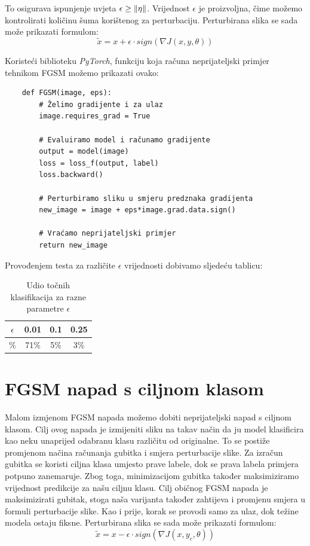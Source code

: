 To osigurava ispunjenje uvjeta $\epsilon \geq \left\|{\eta}\right\|$. Vrijednost $\epsilon$ je proizvoljna, čime možemo kontrolirati količinu šuma korištenog za perturbaciju. Perturbirana slika se sada može prikazati formulom: 
\[\widetilde{x} = x + \epsilon\cdot sign\left(\nabla J(x, y, \theta)\right)\]

Koristeći biblioteku \textit{PyTorch}, funkciju koja računa neprijateljski primjer tehnikom FGSM možemo prikazati ovako:

\begin{verbatim}
    def FGSM(image, eps):
        # Želimo gradijente i za ulaz
        image.requires_grad = True

        # Evaluiramo model i računamo gradijente
        output = model(image)
        loss = loss_f(output, label)
        loss.backward()

        # Perturbiramo sliku u smjeru predznaka gradijenta
        new_image = image + eps*image.grad.data.sign()
        
        # Vraćamo neprijateljski primjer
        return new_image
\end{verbatim}

Provođenjem testa za različite $\epsilon$ vrijednosti dobivamo sljedeću tablicu:

\begin{table}[H]
	\centering
	\begin{tabular}{||c || c | c | c||} 
		\hline
		$\epsilon$ & 0.01 & 0.1 & 0.25 \\ [0.5ex] 
		\hline\hline
		\% & 71\% & 5\% & 3\% \\ 
		\hline
	\end{tabular}
	\caption{Udio točnih klasifikacija za razne parametre $\epsilon$}
\end{table}


\section{FGSM napad s ciljnom klasom}

Malom izmjenom FGSM napada možemo dobiti neprijateljski napad s ciljnom klasom. Cilj ovog napada je izmijeniti sliku na takav način da ju model klasificira kao neku unaprijed odabranu klasu različitu od originalne. To se postiže promjenom načina računanja gubitka i smjera perturbacije slike. Za izračun gubitka se koristi ciljna klasa umjesto prave labele, dok se prava labela primjera potpuno zanemaruje.  Zbog toga, minimizacijom gubitka također maksimiziramo vrijednost predikcije za našu ciljnu klasu. Cilj običnog FGSM napada je maksimizirati gubitak, stoga naša varijanta također zahtijeva i promjenu smjera u formuli perturbacije slike. Kao i prije, korak se provodi samo za ulaz, dok težine modela ostaju fiksne. Perturbirana slika se sada može prikazati formulom: 
\[\widetilde{x} = x - \epsilon\cdot sign\left(\nabla J(x, y_c, \theta)\right)\]

